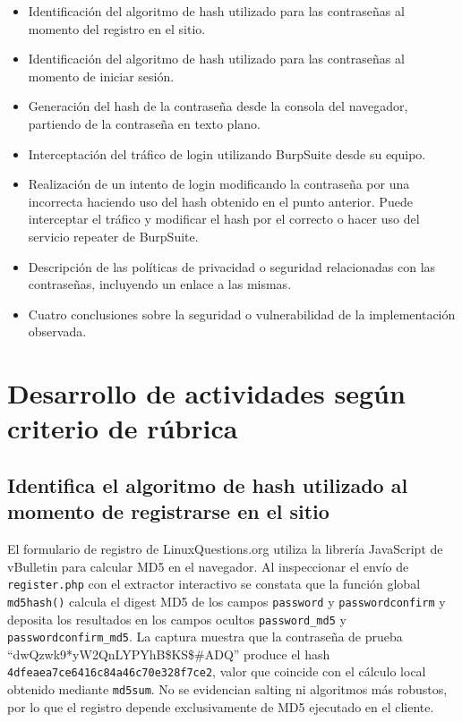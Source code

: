 \documentclass[letter,12pt]{article}
\begin{document}
\begin{itemize}
    \item Identificación del algoritmo de hash utilizado para las contraseñas al momento del registro en el sitio.
    
    \item Identificación del algoritmo de hash utilizado para las contraseñas al momento de iniciar sesión.

    \item Generación del hash de la contraseña desde la consola del navegador, partiendo de la contraseña en texto plano.

    \item Interceptación del tráfico de login utilizando BurpSuite desde su equipo.

    \item Realización de un intento de login modificando la contraseña por una incorrecta haciendo uso del hash obtenido en el punto anterior. Puede interceptar el tráfico y modificar el hash por el correcto o hacer uso del servicio repeater de BurpSuite.

    \item Descripción de las políticas de privacidad o seguridad relacionadas con las contraseñas, incluyendo un enlace a las mismas.

    \item Cuatro conclusiones sobre la seguridad o vulnerabilidad de la implementación observada.
    


    
\end{itemize}

\section{Desarrollo de actividades según criterio de rúbrica}

\subsection{Identifica el algoritmo de hash utilizado al momento de registrarse en el sitio}

El formulario de registro de LinuxQuestions.org utiliza la librería JavaScript de vBulletin para calcular MD5 en el navegador. Al inspeccionar el envío de \texttt{register.php} con el extractor interactivo se constata que la función global \texttt{md5hash()} calcula el digest MD5 de los campos \texttt{password} y \texttt{passwordconfirm} y deposita los resultados en los campos ocultos \texttt{password\_md5} y \texttt{passwordconfirm\_md5}. La captura muestra que la contraseña de prueba ``dwQzwk9*yW2QnLYPYhB\$KS\$\#ADQ'' produce el hash \texttt{4dfeaea7ce6416c84a46c70e328f7ce2}, valor que coincide con el cálculo local obtenido mediante \texttt{md5sum}. No se evidencian salting ni algoritmos más robustos, por lo que el registro depende exclusivamente de MD5 ejecutado en el cliente.
\end{document}
